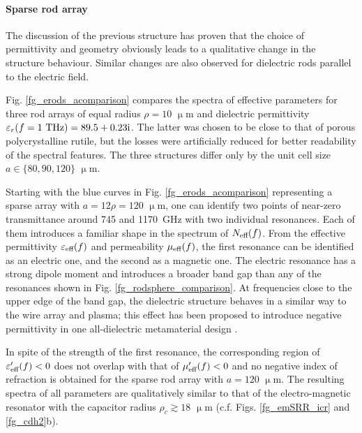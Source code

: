 \paragraph{Sparse rod array} %
The discussion of the previous structure has proven that the choice of permittivity and geometry obviously leads to a qualitative change in the structure behaviour. Similar changes are also observed for dielectric rods parallel to the electric field. 

Fig. \ref{fg_erods_acomparison} compares the spectra of effective parameters for three rod arrays of equal radius $\rho=10$ $\upmu$m and dielectric permittivity $\varepsilon_r(f=1\text{ THz}) = 89.5+0.23{\mathrm i}$. The latter was chosen to be close to that of porous polycrystalline rutile, but the losses were artificially reduced for better readability of the spectral features. The three structures differ only by the unit cell size $a \in \{80, 90, 120\}$ $\upmu$m. %

Starting with the blue curves in Fig. \ref{fg_erods_acomparison} representing a sparse array with $a=12\rho = 120$ $\upmu$m, one can identify two points of near-zero transmittance around 745 and 1170~GHz with two individual resonances. Each of them introduces a familiar shape in the spectrum of $N_{\text{eff} }(f)$. From the effective permittivity $\varepsilon_{\text{eff} }(f)$ and permeability $\mu_{\text{eff} }(f)$, the first resonance can be identified as an electric one, and the second as a magnetic one. The electric resonance has a strong dipole moment and introduces a broader band gap than any of the resonances shown in Fig. \ref{fg_rodsphere_comparison}. At frequencies close to the upper edge of the band gap, the dielectric structure behaves in a similar way to the wire array and plasma; this effect has been proposed to introduce negative permittivity in one all-dielectric metamaterial design \cite{jelinek2009artificial}.  %

In spite of the strength of the first resonance, the corresponding region of $\varepsilon_{\text{eff} }'(f)<0$ does not overlap with that of $\mu_{\text{eff} }'(f)<0$ and no negative index of refraction is obtained  for the sparse rod array with $a=120$ $\upmu$m. The resulting spectra of all parameters are qualitatively similar to that of the electro-magnetic resonator with the capacitor radius $\rho_c\gtrsim 18$ $\upmu$m  (c.f. Figs. \ref{fg_emSRR_icr} and \ref{fg_cdh2}b).

